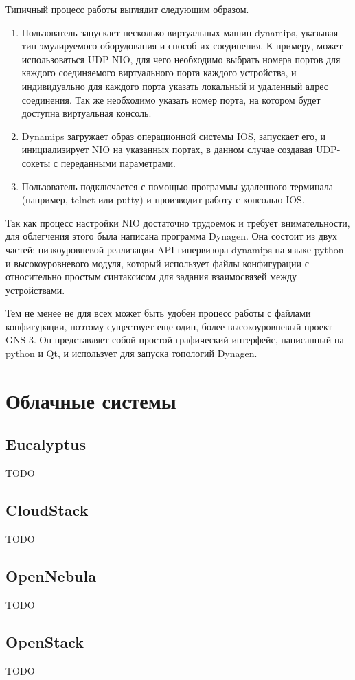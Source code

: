 Типичный процесс работы выглядит следующим образом.
\begin{enumerate}
    \item Пользователь запускает несколько виртуальных машин dynamips, указывая тип
    эмулируемого оборудования и способ их соединения. К примеру, может использоваться
    UDP NIO, для чего необходимо выбрать номера портов для каждого соединяемого
    виртуального порта каждого устройства, и индивидуально для каждого порта указать
    локальный и удаленный адрес соединения.
    Так же необходимо указать номер порта, на котором будет доступна виртуальная консоль.
    \item Dynamips загружает образ операционной системы IOS, запускает его, и инициализирует
    NIO на указанных портах, в данном случае создавая UDP-сокеты с переданными параметрами.
    \item Пользователь подключается с помощью программы удаленного терминала (например,
    telnet или putty) и производит работу с консолью IOS.
\end{enumerate}

Так как процесс настройки NIO достаточно трудоемок и требует внимательности, для облегчения
этого была написана программа Dynagen.\cite{website:dynagen} Она состоит из двух частей:
низкоуровневой реализации API гипервизора dynamips на языке python и высокоуровневого
модуля, который использует файлы конфигурации с относительно простым синтаксисом
для задания взаимосвязей между устройствами.

Тем не менее не для всех может быть удобен процесс работы с файлами конфигурации, 
поэтому существует еще один, более высокоуровневый проект -- GNS 3.\cite{website:gns3}
Он представляет собой простой графический интерфейс, написанный на python и Qt, и использует
для запуска топологий Dynagen.

\section{Облачные системы}

\subsection{Eucalyptus}
TODO

\subsection{CloudStack}
TODO

\subsection{OpenNebula}
TODO

\subsection{OpenStack}
TODO

